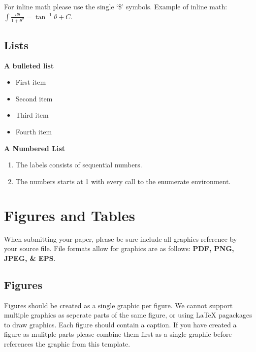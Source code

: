 \documentclass{csmagazine}
\begin{document}
For inline math please use the single `\$' symbols. Example of inline math: $\int\frac{d\theta} {1+\theta^2}=\tan^{-1} \theta+C$.

\subsection{Lists}

\textbf{A bulleted list}

\begin{itemize}
	\item First item
	\item Second item
	\item Third item
	\item Fourth item
\end{itemize}

\textbf{A Numbered List}

\begin{enumerate}
	\item The labels consists of sequential numbers.
	\item The numbers starts at 1 with every call to the enumerate environment.
\end{enumerate}






\section{Figures and Tables}

When submitting your paper, please be sure include all graphics reference by your source file. File formats allow for graphics are as follows: \textbf{PDF, PNG, JPEG, \& EPS}.

\subsection{Figures}

Figures should be created as a single graphic per figure. We cannot support multiple graphics as seperate parts of the same figure, or using LaTeX pagackages to draw graphics. Each figure should contain a caption. If you have created a figure as mulitple parts please combine them first as a single graphic before references the graphic from this template.
\end{document}
